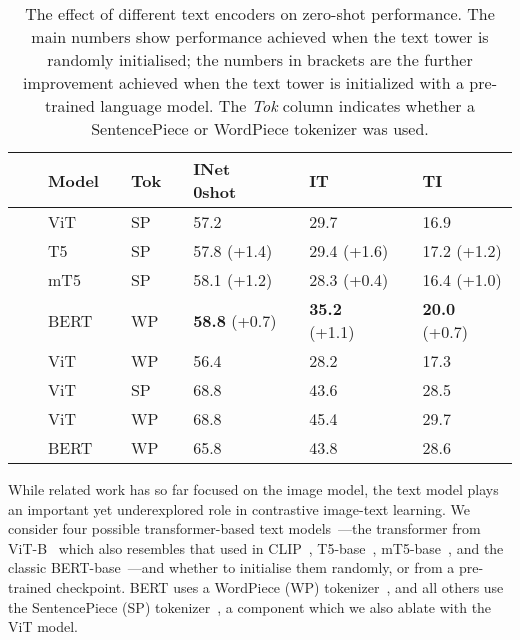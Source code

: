 \documentclass[10pt,twocolumn,letterpaper]{article}
\begin{document}
\begin{table}[t]
  \setlength{\tabcolsep}{0pt}
  \setlength{\extrarowheight}{5pt}
  \renewcommand{\arraystretch}{0.75}
  \centering
\begin{tabularx}{\linewidth}{p{0.4cm}p{0.1cm}p{1.2cm}p{0.1cm}p{0.5cm}p{0.1cm}Cp{0.1cm}Cp{0.1cm}C}
    \toprule[1pt]
     && \textbf{Model} && \textbf{Tok} && \textbf{INet 0shot} && \textbf{IT} && \textbf{TI} \\
    \midrule
     && ViT  && SP && 57.2 \phantom{(+0.0)} && 29.7 \phantom{(+0.0)} && 16.9 \phantom{(+0.0)} \\
     && T5   && SP && 57.8 (+1.4)           && 29.4 (+1.6)           && 17.2 (+1.2) \\
     && mT5  && SP && 58.1 (+1.2)           && 28.3 (+0.4)           && 16.4 (+1.0) \\
     && BERT && WP && \textbf{58.8} (+0.7)  && \textbf{35.2} (+1.1)  && \textbf{20.0} (+0.7) \\
     && ViT  && WP && 56.4 \phantom{(+0.0)} && 28.2 \phantom{(+0.0)} && 17.3 \phantom{(+0.0)} \\
    \midrule[0.25pt]
      && ViT  && SP && 68.8 \phantom{(+0.0)} && 43.6 \phantom{(+0.0)} && 28.5 \phantom{(+0.0)} \\
     && ViT  && WP && 68.8 \phantom{(+0.0)} && 45.4 \phantom{(+0.0)} && 29.7 \phantom{(+0.0)} \\
     && BERT && WP && 65.8 \phantom{(+0.0)} && 43.8 \phantom{(+0.0)} && 28.6 \phantom{(+0.0)} \\
    \bottomrule[1pt]
  \end{tabularx}
\caption{The effect of different text encoders on zero-shot performance. The  main  numbers  show  performance  achieved  when the text tower is randomly initialised; the numbers in brackets are the further improvement achieved when the text tower is initialized with a pre-trained language model.
The \emph{Tok} column indicates whether a SentencePiece or WordPiece tokenizer was used.}\label{tab:text_encoder}
\end{table}

While related work has so far focused on the image model, the text model plays an important yet 
underexplored role in contrastive image-text learning. We consider four possible transformer-based text models~\cite{transformer}---the transformer from ViT-B~\cite{vit} which also resembles that used in CLIP~\cite{clip}, T5-base~\cite{T5}, mT5-base~\cite{mt5}, and the classic BERT-base~\cite{bert}---and whether to initialise them randomly, or from a pre-trained checkpoint. BERT uses a WordPiece (WP) tokenizer~\cite{translate,japkorvoice}, and all others use the SentencePiece (SP) tokenizer~\cite{sentencepiece}, a component which we also ablate with the ViT model.
\end{document}
